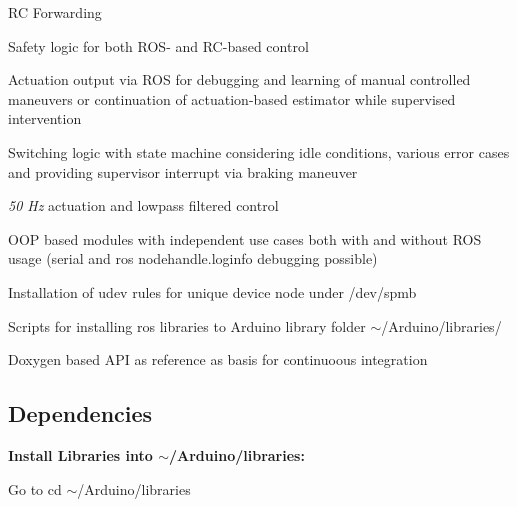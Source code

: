 \begin{DoxyItemize}
\item RC Forwarding
\item Safety logic for both R\+O\+S-\/ and R\+C-\/based control
\item Actuation output via R\+OS for debugging and learning of manual controlled maneuvers or continuation of actuation-\/based estimator while supervised intervention
\item Switching logic with state machine considering idle conditions, various error cases and providing supervisor interrupt via braking maneuver
\item {\itshape 50 Hz} actuation and lowpass filtered control
\item O\+OP based modules with independent use cases both with and without R\+OS usage (serial and ros nodehandle.\+loginfo debugging possible)
\item Installation of udev rules for unique device node under {\ttfamily /dev/spmb}
\item Scripts for installing ros libraries to Arduino library folder {\ttfamily $\sim$/\+Arduino/libraries/}
\item Doxygen based A\+PI as reference as basis for continuoous integration
\end{DoxyItemize}

\subsection*{Dependencies}

{\bfseries Install Libraries into {\ttfamily $\sim$/\+Arduino/libraries}\+:}

Go to {\ttfamily cd $\sim$/\+Arduino/libraries}


